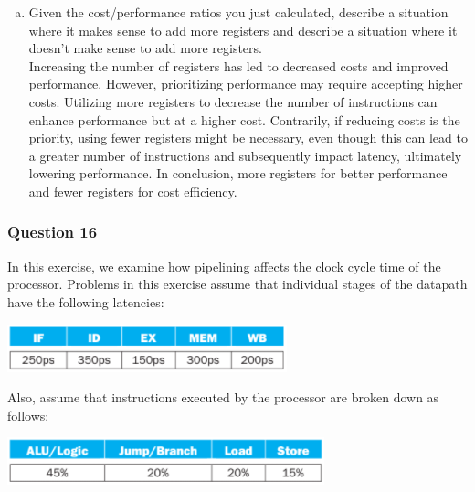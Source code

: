 \documentclass[11pt]{article}
\begin{document}
\begin{enumerate}[(a)]
    \item Given the cost/performance ratios you just calculated, describe a situation where it makes sense to add more registers and describe a situation where it doesn't make sense to add more registers.\\
    Increasing the number of registers has led to decreased costs and improved performance. However, prioritizing performance may require accepting higher costs. 
    Utilizing more registers to decrease the number of instructions can enhance performance but at a higher cost. 
    Contrarily, if reducing costs is the priority, using fewer registers might be necessary, even though this can lead to a greater number of instructions
     and subsequently impact latency, ultimately lowering performance. In conclusion, more registers for better performance and fewer registers for cost efficiency.
\end{enumerate}

\setcounter{subsubsection}{15}
\subsubsection{Question 16}
In this exercise, we examine how pipelining affects the clock cycle time of the processor. Problems in this exercise assume that individual stages of the datapath have the following latencies:
\begin{center}\includegraphics[scale=0.68]{q16_image1}\\\end{center}
Also, assume that instructions executed by the processor are broken down as follows:
\begin{center}\includegraphics[scale=0.6]{q16_image2}\\\end{center}
\end{document}
